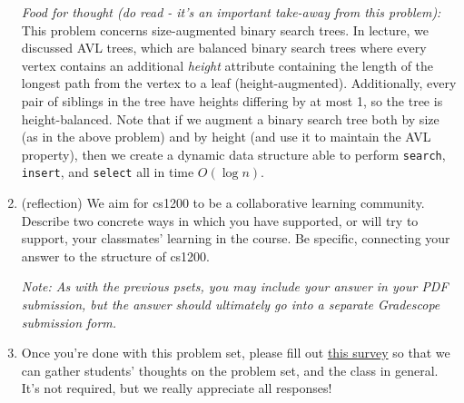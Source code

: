 \documentclass[11pt]{article}
\begin{document}
\begin{enumerate}
\begin{enumerate}
    \end{enumerate}
    
    \emph{Food for thought (do read - it's an important take-away from this problem):} This problem concerns size-augmented binary search trees. In lecture, we discussed AVL trees, which are balanced binary search trees where every vertex contains an additional \textit{height} attribute containing the length of the longest path from the vertex to a leaf (height-augmented). Additionally, every pair of siblings in the tree have heights differing by at most 1, so the tree is height-balanced. Note that if we augment a binary search tree both by size (as in the above problem) and by height (and use it to maintain the AVL property), then we create a dynamic data structure able to perform \texttt{search}, \texttt{insert}, and \texttt{select} all in time $O(\log n)$. 


\item (reflection) We aim for cs1200 to be a collaborative learning community. Describe two concrete ways in which you have supported, or will try to support, your classmates' learning in the course.  Be specific, connecting your answer to the structure of cs1200. 

\textit{Note: As with the previous psets, you may include your answer in your PDF submission, but the answer should ultimately go into a separate Gradescope submission form.}

\item Once you're done with this problem set, please fill out \href{https://forms.gle/pyhGJ73HpodhThNP9}{this survey} so that we can gather students' thoughts on the problem set, and the class in general. It's not required, but we really appreciate all responses!

\end{enumerate}
\end{document}
